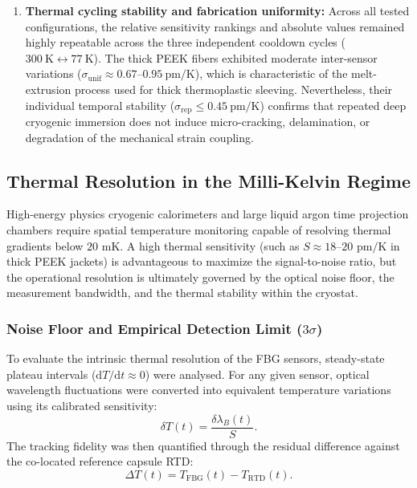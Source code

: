 \documentclass[preprint,11pt]{elsarticle}
\begin{document}
\begin{enumerate}
    \item \textbf{Thermal cycling stability and fabrication uniformity:} Across all tested configurations, the relative sensitivity rankings and absolute values remained highly repeatable across the three independent cooldown cycles ($300~\text{K} \leftrightarrow 77~\text{K}$). The thick PEEK fibers exhibited moderate inter-sensor variations ($\sigma_{\text{unif}} \approx 0.67$--$0.95~\text{pm/K}$), which is characteristic of the melt-extrusion process used for thick thermoplastic sleeving. Nevertheless, their individual temporal stability ($\sigma_{\text{rep}} \le 0.45~\text{pm/K}$) confirms that repeated deep cryogenic immersion does not induce micro-cracking, delamination, or degradation of the mechanical strain coupling.
\end{enumerate}

\subsection{Thermal Resolution in the Milli-Kelvin Regime}
\label{subsec:millikelvin_resolution}

High-energy physics cryogenic calorimeters and large liquid argon time projection chambers require spatial temperature monitoring capable of resolving thermal gradients below $20\text{ mK}$. A high thermal sensitivity (such as $S \approx 18\text{--}20\text{ pm/K}$ in thick PEEK jackets) is advantageous to maximize the signal-to-noise ratio, but the operational resolution is ultimately governed by the optical noise floor, the measurement bandwidth, and the thermal stability within the cryostat.

\subsubsection{Noise Floor and Empirical Detection Limit ($3\sigma$)}

To evaluate the intrinsic thermal resolution of the FBG sensors, steady-state plateau intervals ($\mathrm{d}T/\mathrm{d}t \approx 0$) were analysed. For any given sensor, optical wavelength fluctuations were converted into equivalent temperature variations using its calibrated sensitivity:
\begin{equation}
    \delta T(t) = \frac{\delta \lambda_B(t)}{S}.
    \label{eq:delta_T_conversion}
\end{equation}
The tracking fidelity was then quantified through the residual difference against the co-located reference capsule RTD:
\begin{equation}
    \Delta T(t) = T_{\mathrm{FBG}}(t) - T_{\mathrm{RTD}}(t).
    \label{eq:residual_def}
\end{equation}
\end{document}
